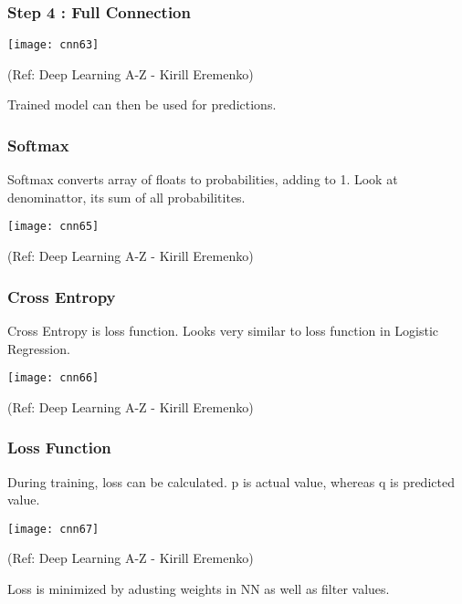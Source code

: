 \begin{frame}[fragile] \frametitle{Step 4 : Full Connection}

\begin{center}
\texttt{[image: cnn63]}

\tiny{(Ref: Deep Learning A-Z - Kirill Eremenko)}
\end{center}

Trained model can then be used for predictions.
\end{frame}


\begin{frame}[fragile] \frametitle{Softmax}

Softmax converts array of floats to probabilities, adding to 1. Look at denominattor, its sum of all probabilitites.

\begin{center}
\texttt{[image: cnn65]}

\tiny{(Ref: Deep Learning A-Z - Kirill Eremenko)}
\end{center}


\end{frame}

\begin{frame}[fragile] \frametitle{Cross Entropy}

Cross Entropy is loss function. Looks very similar to loss function in Logistic Regression.

\begin{center}
\texttt{[image: cnn66]}

\tiny{(Ref: Deep Learning A-Z - Kirill Eremenko)}
\end{center}


\end{frame}


\begin{frame}[fragile] \frametitle{Loss Function}

During training, loss can be calculated. p is actual value, whereas q is predicted value.

\begin{center}
\texttt{[image: cnn67]}

\tiny{(Ref: Deep Learning A-Z - Kirill Eremenko)}
\end{center}

Loss is minimized by adusting weights in NN as well as filter values.
\end{frame}


